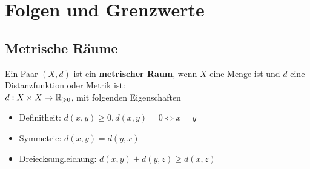 \documentclass[main.tex]{subfiles}
\begin{document}
\chapter{Folgen und Grenzwerte}


\section{Metrische Räume}

\begin{Definition}
  Ein Paar $(X,d)$ ist ein \textbf{metrischer Raum}, wenn $X$ eine Menge ist und $d$ eine Distanzfunktion oder Metrik ist:\\
  $d: X \times X \to \mathbb{R}_{\geqslant 0}$, mit folgenden Eigenschaften
  \begin{itemize}
    \item Definitheit: $d(x,y) \geq 0, d(x,y) = 0 \Leftrightarrow x = y$
    \item Symmetrie: $d(x,y) = d(y,x)$
    \item Dreiecksungleichung: $d(x,y) + d(y,z) \geq d(x,z)$
  \end{itemize}
\end{Definition}
\end{document}
